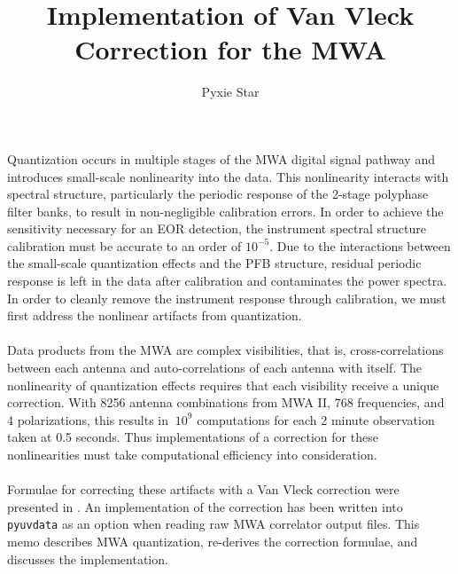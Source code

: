 \documentclass[11pt]{article}
\title{Implementation of Van Vleck Correction for the MWA}
\author{Pyxie Star}
\begin{document}
\maketitle
\paragraph{}Quantization occurs in multiple stages of the MWA digital signal pathway and introduces small-scale nonlinearity into the data. This nonlinearity interacts with spectral structure, particularly the periodic response of the 2-stage polyphase filter banks, to result in non-negligible calibration errors. In order to achieve the sensitivity necessary for an EOR detection, the instrument spectral structure calibration must be accurate to an order of $10^{-5}$. Due to the interactions between the small-scale quantization effects and the PFB structure, residual periodic response is left in the data after calibration and contaminates the power spectra. In order to cleanly remove the instrument response through calibration, we must first address the nonlinear artifacts from quantization.

\paragraph{}
Data products from the MWA are complex visibilities, that is, cross-correlations between each antenna and auto-correlations of each antenna with itself. The nonlinearity of quantization effects requires that each visibility receive a unique correction. With 8256 antenna combinations from MWA II, 768 frequencies, and 4 polarizations, this results in $~10^9$ computations for each 2 minute observation taken at 0.5 seconds. Thus implementations of a correction for these nonlinearities must take computational efficiency into consideration.

\paragraph{}Formulae for correcting these artifacts with a Van Vleck correction were presented in \cite{VV}. An implementation of the correction has been written into \texttt{pyuvdata} as an option when reading raw MWA correlator output files. This memo describes MWA quantization, re-derives the correction formulae, and discusses the implementation.
\end{document}
